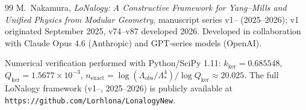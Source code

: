 \documentclass[12pt]{article}
\begin{document}
\begin{thebibliography}{99}
M.~Nakamura,
\textit{LoNalogy: A Constructive Framework for Yang--Mills and
Unified Physics from Modular Geometry},
manuscript series v1-- (2025--2026);
v1 originated September 2025,
v74--v87 developed 2026.
Developed in collaboration with Claude Opus 4.6 (Anthropic)
and GPT-series models (OpenAI).

Numerical verification performed with Python/SciPy 1.11:
$k_{\mathrm{ker}}=0.685548$,
$Q_{\mathrm{ker}}=1.5677\times10^{-3}$,
$n_{\mathrm{exact}}=\log(\Lambda_{\mathrm{obs}}/\Lambda_*^4)/\log Q_{\mathrm{ker}}\approx20.025$.
The full LoNalogy framework (v1--, 2025--2026) is publicly available at
\texttt{https://github.com/Lorhlona/LonalogyNew}.

\end{thebibliography}
\end{document}

